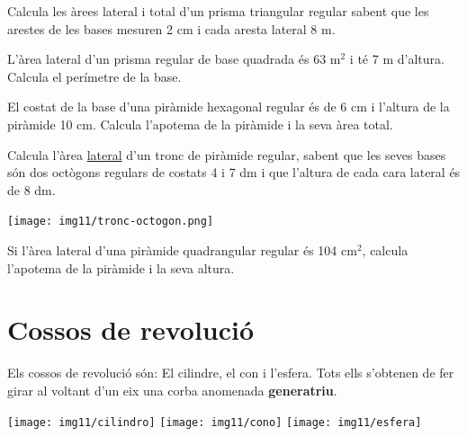 \begin{mylist}
	
\exer Calcula les àrees lateral i total d'un prisma triangular regular sabent que les arestes de les bases mesuren 2 cm i cada aresta lateral 8 m.

\exer  L'àrea lateral d'un prisma regular de base quadrada és 63 m${}^{2}$ i té 7 m d'altura. Calcula el perímetre de la base.

\exer  El costat de la base d'una piràmide hexagonal regular és de 6 cm i l'altura de la piràmide 10 cm. Calcula l'apotema de la piràmide i la seva àrea total.

\vspace{-1cm}
\exer[1]  \begin{minipage}[t]{0.7\textwidth} Calcula l'àrea \underline{lateral} d'un tronc de piràmide regular, sabent que les seves bases són dos octògons regulars de costats 4 i 7 dm i que l'altura de cada cara lateral és de 8 dm. 
\end{minipage}
\begin{minipage}{0.25\textwidth}
	\vspace{1cm}
	\centering
\texttt{[image: img11/tronc-octogon.png]}
\end{minipage}

\exer[1]  \hot Si l'àrea lateral d'una piràmide quadrangular regular és 104 cm${}^{2}$, calcula l'apotema de la piràmide i la seva altura.
 
\end{mylist}


\section{Cossos de revolució}

\begin{theorybox}
	Els cossos de revolució són: El cilindre, el con i l'esfera. Tots ells s'obtenen de fer girar al voltant d'un eix una corba anomenada \textbf{generatriu}.
	\begin{center}
		\texttt{[image: img11/cilindro]} \quad
			\texttt{[image: img11/cono]}  \quad
				\texttt{[image: img11/esfera]} 
	\end{center}
	
\end{theorybox}

